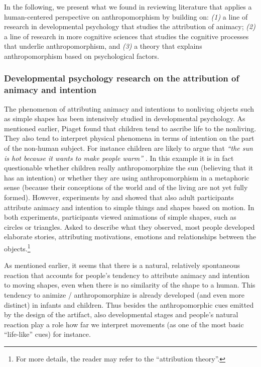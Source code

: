 \documentclass{frontiersSCNS} %
\begin{document}
In the following, we present what we found in reviewing literature that applies
a human-centered perspective on anthropomorphism by building on: \textit{(1)} a
line of research in developmental psychology that studies the attribution of
animacy; \textit{(2)} a line of research in more cognitive sciences that studies
the cognitive processes that underlie anthropomorphism, and \textit{(3)} a
theory that explains anthropomorphism based on psychological factors. 


\subsubsection{Developmental psychology research on the attribution of animacy and intention\\}
\label{sec:developmental-expl}

The phenomenon of attributing animacy and intentions to nonliving objects such
as simple shapes has been intensively studied in developmental psychology. As
mentioned earlier, Piaget found that children tend to ascribe life to the
nonliving. They also tend to interpret physical phenomena in terms of intention
on the part of the non-human subject. For instance children are likely to argue
that \textit{``the sun is hot because it wants to make people warm''}
\citep{leeds_childrens_1992}. In this example it is in fact questionable whether
children really anthropomorphize the sun (believing that it has an intention) or
whether they are using anthropomorphism in a metaphoric sense (because their
conceptions of the world and of the living are not yet fully formed). However,
experiments by \cite{heider_experimental_1944} and
\cite{michotte_perception_1963} showed that also adult participants attribute
animacy and intention to simple things and shapes based on motion. In both
experiments, participants viewed animations of simple shapes, such as circles or
triangles. Asked to describe what they observed, most people developed elaborate
stories, attributing motivations, emotions and relationships between the
objects.\footnote{For more details, the reader may refer to the ``attribution
theory''.}

As mentioned earlier, it seems that there is a natural, relatively spontaneous
reaction that accounts for people's tendency to attribute animacy and intention
to moving shapes, even when there is no similarity of the shape to a human. This
tendency to animize / anthropomorphize is already developed (and even more
distinct) in infants and children. Thus besides the anthropomorphic cues emitted
by the design of the artifact, also developmental stages and people's natural
reaction play a role how far we interpret movements (as one of the
most basic ``life-like'' cues) for instance.
\end{document}
